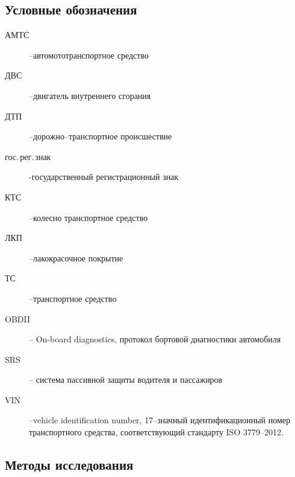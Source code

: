 \subsection{Условные обозначения}
\begin{description}
%	 
\item[АМТС] --автомототранспортное средство
\item[ДВС] --двигатель внутреннего сгорания
\item[ДТП] --дорожно--транспортное происшествие
\item[гос.\,рег.\,знак] -государственный регистрационный знак
\item[КТС] --колесно транспортное средство 
\item[ЛКП] --лакокрасочное покрытие
\item[ТС] --транспортное средство
\item[OBDII] -- On-board diagnostics, протокол бортовой диагностики автомобиля
\item[SRS] -- система пассивной защиты водителя и пассажиров
\item[VIN] --vehicle identification number, 17--значный идентификационный номер транспортного средства, соответствующий стандарту ISO 3779--2012.
%
\end{description}

\subsection{Методы исследования}

